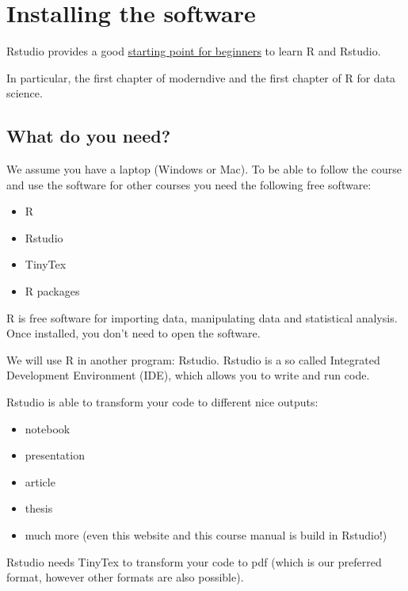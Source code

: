 \documentclass[
]{book}
\providecommand{\tightlist}{%
  \setlength{\itemsep}{0pt}\setlength{\parskip}{0pt}}
\begin{document}
\hypertarget{installing-the-software}{%
\chapter{Installing the software}\label{installing-the-software}}

Rstudio provides a good \href{https://education.rstudio.com/learn/beginner/}{starting point for beginners} to learn R and Rstudio.

In particular, the first chapter of moderndive and the first chapter of R for data science.

\hypertarget{what-do-you-need}{%
\section{What do you need?}\label{what-do-you-need}}

We assume you have a laptop (Windows or Mac). To be able to follow the course and use the software for other courses you need the following free software:

\begin{itemize}
\tightlist
\item
  R
\item
  Rstudio
\item
  TinyTex
\item
  R packages
\end{itemize}

R is free software for importing data, manipulating data and statistical analysis. Once installed, you don't need to open the software.

We will use R in another program: Rstudio. Rstudio is a so called Integrated Development Environment (IDE), which allows you to write and run code.

Rstudio is able to transform your code to different nice outputs:

\begin{itemize}
\tightlist
\item
  notebook
\item
  presentation
\item
  article
\item
  thesis
\item
  much more (even this website and this course manual is build in Rstudio!)
\end{itemize}

Rstudio needs TinyTex to transform your code to pdf (which is our preferred format, however other formats are also possible).
\end{document}
